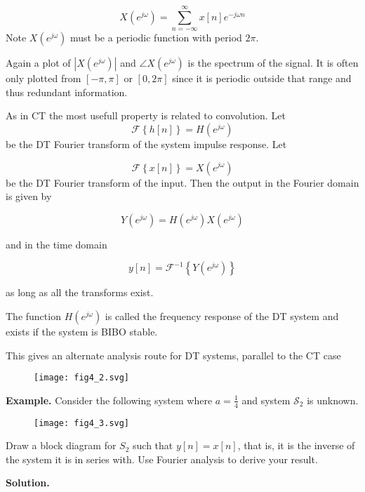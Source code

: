 \documentclass{article}
\begin{document}
\[
X\left(e^{j\omega}\right) = \sum\limits_{n = -\infty}^{\infty} x[n] e^{-j\omega n}
\]
Note $X\left(e^{j\omega}\right)$ must be a periodic function with period $2\pi$.

Again a plot of $|X\left(e^{j\omega}\right)|$ and $\angle X\left(e^{j\omega}\right)$ is the spectrum of the signal. It is often only plotted from $[-\pi, \pi]$ or $[0, 2\pi]$ since it is periodic outside that range and thus redundant information.

As in CT the most usefull property is related to convolution. Let
\[
\mathcal{F}\left\{ h[n]\right\} = H\left(e^{j\omega}\right)
\]
be the DT Fourier transform of the system impulse response. Let

\[
\mathcal{F}\left\{ x[n]\right\} = X\left(e^{j\omega}\right)
\]
be the DT Fourier transform of the input. Then the output in the Fourier domain is given by

\[
Y\left(e^{j\omega}\right) = H\left(e^{j\omega}\right) X\left(e^{j\omega}\right)
\]

and in the time domain

\[
y[n] = \mathcal{F}^{-1}\left\{ Y\left(e^{j\omega}\right) \right\}
\]

as long as all the transforms exist.

The function $H\left(e^{j\omega}\right)$ is called the frequency response of the DT system and exists if the system is BIBO stable.

This gives an alternate analysis route for DT systems, parallel to the CT case

\begin{figure}
  \centering
  \texttt{[image: fig4\_2.svg]}
\end{figure}

\textbf{Example.} Consider the following system where $a = \frac{1}{4}$ and system $\mathcal{S}_2$ is unknown.

\begin{figure}
  \centering
  \texttt{[image: fig4\_3.svg]}
\end{figure}

Draw a block diagram for $S_2$ such that $y[n] = x[n]$, that is, it is the inverse of the system it is in series with. Use Fourier analysis to derive your result.

\textbf{Solution.}
\end{document}
